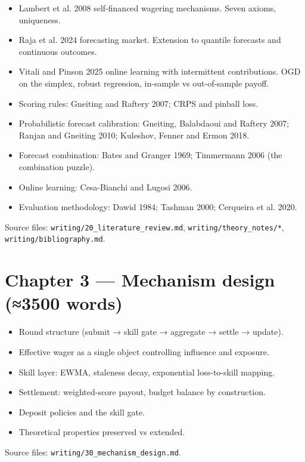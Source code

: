 \documentclass[11pt,a4paper,openany]{report}
\begin{document}
\begin{itemize}
  \item Lambert et al. 2008 self-financed wagering mechanisms. Seven axioms,
    uniqueness.
  \item Raja et al. 2024 forecasting market. Extension to quantile forecasts
    and continuous outcomes.
  \item Vitali and Pinson 2025 online learning with intermittent contributions.
    OGD on the simplex, robust regression, in-sample vs out-of-sample payoff.
  \item Scoring rules: Gneiting and Raftery 2007; CRPS and pinball loss.
  \item Probabilistic forecast calibration: Gneiting, Balabdaoui and Raftery
    2007; Ranjan and Gneiting 2010; Kuleshov, Fenner and Ermon 2018.
  \item Forecast combination: Bates and Granger 1969; Timmermann 2006 (the
    combination puzzle).
  \item Online learning: Cesa-Bianchi and Lugosi 2006.
  \item Evaluation methodology: Dawid 1984; Tashman 2000; Cerqueira et al. 2020.
\end{itemize}

Source files: \texttt{writing/20\_literature\_review.md},
\texttt{writing/theory\_notes/*}, \texttt{writing/bibliography.md}.

\section{Chapter 3 — Mechanism design (≈3500 words)}

\begin{itemize}
  \item Round structure (submit → skill gate → aggregate → settle → update).
  \item Effective wager as a single object controlling influence and exposure.
  \item Skill layer: EWMA, staleness decay, exponential loss-to-skill mapping.
  \item Settlement: weighted-score payout, budget balance by construction.
  \item Deposit policies and the skill gate.
  \item Theoretical properties preserved vs extended.
\end{itemize}

Source files: \texttt{writing/30\_mechanism\_design.md}.
\end{document}
